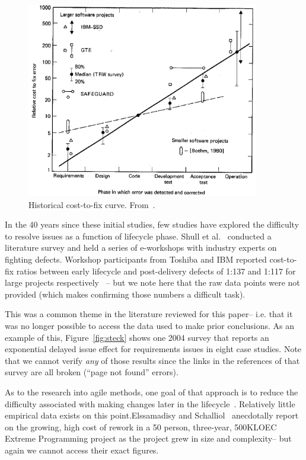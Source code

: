 \documentclass[smallcondesed]{svjour3}
\newcommand{\fig}[1]{Figure~\ref{fig:#1}}
\begin{document}
\begin{figure}[!b]
\begin{center}\includegraphics[width=4in]{img/boehm_cost-to-fix.png}\end{center}
 \caption{Historical cost-to-fix curve. From~\cite{Boehm81}.}\label{fig:cost-to-fix}
 \end{figure}
 
In the 40 years since these initial studies, few studies have explored the difficulty to resolve issues
as a function of lifecycle phase. 
Shull et al.~\cite{Shull02} conducted a literature survey and held a series of e-workshops with industry experts on fighting defects. Workshop participants from Toshiba and IBM reported cost-to-fix ratios between early lifecycle and post-delivery defects of 1:137 and 1:117 for large projects respectively~\cite{Shull02} -- but we note here that the raw data points were not provided (which makes confirming those numbers 
a difficult task). 

This was a common theme in the literature reviewed for this paper-- i.e.  that  it was no longer possible to access
the data used to make prior conclusions.
As an example of this, \fig{steck} shows one 2004 survey that reports an 
exponential delayed issue  effect for 
requirements issues in eight case studies. Note that we cannot verify
{\em any} of those results since the links in the references of
that  survey are all broken (``page not found'' errors).


As to the research into agile methods, one goal of that approach
is to reduce the difficulty associated with making changes later in the lifecycle~\cite{beck00}. Relatively little empirical data exists on this point.Elssamadisy and Schalliol~\cite{Elssamadisy02} anecdotally report on the growing, high cost of rework in a 50 person, three-year, 500KLOEC Extreme Programming project as the project grew in size and complexity-- but again we cannot access their 
exact figures.
\end{document}
